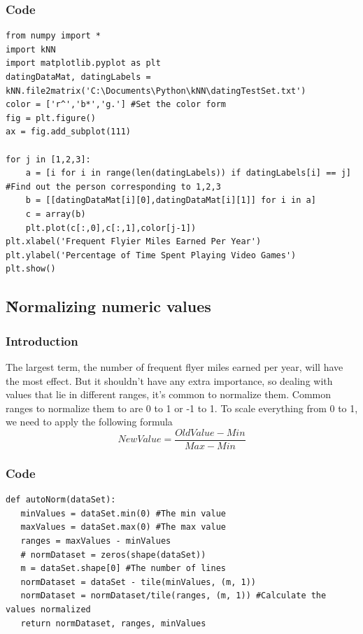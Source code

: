 \documentclass[12pt]{article}
\begin{document}
\subsubsection{Code}
\begin{lstlisting}
from numpy import *
import kNN
import matplotlib.pyplot as plt
datingDataMat, datingLabels = kNN.file2matrix('C:\Documents\Python\kNN\datingTestSet.txt')
color = ['r^','b*','g.'] #Set the color form
fig = plt.figure()
ax = fig.add_subplot(111)

for j in [1,2,3]:
    a = [i for i in range(len(datingLabels)) if datingLabels[i] == j] #Find out the person corresponding to 1,2,3
    b = [[datingDataMat[i][0],datingDataMat[i][1]] for i in a]
    c = array(b)
    plt.plot(c[:,0],c[:,1],color[j-1])
plt.xlabel('Frequent Flyier Miles Earned Per Year')
plt.ylabel('Percentage of Time Spent Playing Video Games')
plt.show()

\end{lstlisting}

\subsection{\H Normalizing numeric values}
\subsubsection{Introduction}
The largest term, the number of frequent flyer miles earned per year, will have the most effect. But it shouldn't have any extra importance, so dealing with values that lie in different ranges, it's common to normalize them. Common ranges to normalize them to are 0 to 1 or -1 to 1. To scale everything from 0 to 1, we need to apply the following formula
$$NewValue = \frac{OldValue - Min}{Max - Min}$$
\subsubsection{Code}
\begin{lstlisting}
def autoNorm(dataSet):
   minValues = dataSet.min(0) #The min value
   maxValues = dataSet.max(0) #The max value
   ranges = maxValues - minValues
   # normDataset = zeros(shape(dataSet)) 
   m = dataSet.shape[0] #The number of lines
   normDataset = dataSet - tile(minValues, (m, 1))
   normDataset = normDataset/tile(ranges, (m, 1)) #Calculate the values normalized
   return normDataset, ranges, minValues

\end{lstlisting}
\end{document}
